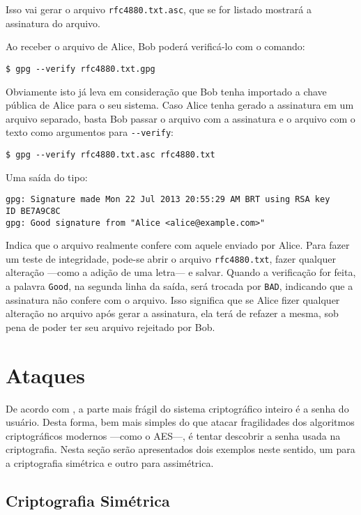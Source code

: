 \documentclass[12px,a4paper,twoside]{article}
\begin{document}
Isso vai gerar o arquivo \texttt{rfc4880.txt.asc}, que se for listado mostrará
a assinatura do arquivo.

Ao receber o arquivo de Alice, Bob poderá verificá-lo com o comando:

\begin{verbatim}
$ gpg --verify rfc4880.txt.gpg
\end{verbatim}

Obviamente isto já leva em consideração que Bob tenha importado a chave pública
de Alice para o seu sistema.  Caso Alice tenha gerado a assinatura em um
arquivo separado, basta Bob passar o arquivo com a assinatura e o arquivo com o
texto como argumentos para \texttt{-{}-verify}:

\begin{verbatim}
$ gpg --verify rfc4880.txt.asc rfc4880.txt
\end{verbatim}

Uma saída do tipo:

\begin{verbatim}
gpg: Signature made Mon 22 Jul 2013 20:55:29 AM BRT using RSA key
ID BE7A9C8C
gpg: Good signature from "Alice <alice@example.com>"
\end{verbatim}

Indica que o arquivo realmente confere com aquele enviado por Alice.  Para
fazer um teste de integridade, pode-se abrir o arquivo \texttt{rfc4880.txt},
fazer qualquer alteração ---como a adição de uma letra--- e salvar.  Quando a
verificação for feita, a palavra \texttt{Good}, na segunda linha da saída, será
trocada por \texttt{BAD}, indicando que a assinatura não confere com o arquivo.
Isso significa que se Alice fizer qualquer alteração no arquivo após gerar a
assinatura, ela terá de refazer a mesma, sob pena de poder ter seu arquivo
rejeitado por Bob.


\section{Ataques}
\label{sec:ataques}

De acordo com \cite{gnupg:man}, a parte mais frágil do sistema criptográfico
inteiro é a senha do usuário.  Desta forma, bem mais simples do que atacar
fragilidades dos algoritmos criptográficos modernos ---como o AES---,  é tentar
descobrir a senha usada na criptografia.  Nesta seção serão apresentados dois
exemplos neste sentido, um para a criptografia simétrica e outro para
assimétrica.

\subsection{Criptografia Simétrica}
\label{sec:ataques:simetrica}
\end{document}
